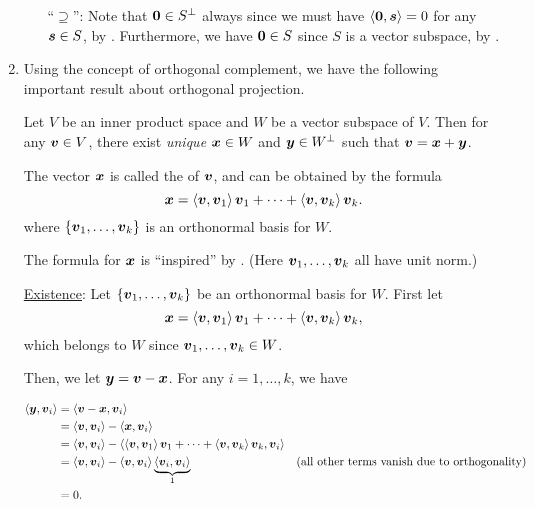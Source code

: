 \begin{enumerate}
\begin{pf}
\begin{enumerate}
``\(\supseteq\)'': Note that \(\vb*{0}\in S^{\perp}\) always since we must
have \(\left\langle \vb*{0},\vb*{s}\right\rangle=0\) for any \(\vb*{s}\in S\), by
. Furthermore, we have \(\vb*{0}\in S\) since \(S\) is
a vector subspace, by .
\end{enumerate}
\end{pf}
\item Using the concept of orthogonal complement, we have the following
important result about orthogonal projection.
\begin{theorem}
\label{thm:orthog-decomp}
Let \(V\) be an inner product space and \(W\) be a vector subspace of \(V\).
Then for any \(\vb*{v}\in V\), there exist \emph{unique} \(\vb*{x}\in W\) and
\(\vb*{y}\in W^{\perp}\) such that \(\vb*{v}=\vb*{x}+\vb*{y}\).

The vector \(\vb*{x}\) is called the  of
\(\vb*{v}\), and can be obtained by the formula
\[
\vb*{x}=\left\langle \vb*{v},\vb*{v}_1\right\rangle\vb*{v}_1+\dotsb+\left\langle \vb*{v},\vb*{v}_k\right\rangle\vb*{v}_k.
\]
where \(\{\vb*{v}_1,\dotsc,\vb*{v}_k\}\) is an orthonormal basis for \(W\).
\end{theorem}
\begin{note}
The formula for \(\vb*{x}\) is ``inspired'' by .
(Here \(\vb*{v}_1,\dotsc,\vb*{v}_k\) all have unit norm.)
\end{note}

\begin{pf}
\underline{Existence}: Let \(\{\vb*{v}_1,\dotsc,\vb*{v}_k\}\) be an
orthonormal basis for \(W\). First let
\[
\vb*{x}=\left\langle \vb*{v},\vb*{v}_1\right\rangle\vb*{v}_1+\dotsb+\left\langle \vb*{v},\vb*{v}_k\right\rangle\vb*{v}_k,
\]
which belongs to \(W\) since \(\vb*{v}_1,\dotsc,\vb*{v}_k\in W\).

Then, we let \(\vb*{y}=\vb*{v}-\vb*{x}\). For any \(i=1,\dotsc,k\), we have
\end{pf}
\begin{align*}
\left\langle \vb*{y},\vb*{v}_i\right\rangle&=\left\langle \vb*{v}-\vb*{x},\vb*{v}_i\right\rangle \\
&=\left\langle \vb*{v},\vb*{v}_i\right\rangle-\left\langle \vb*{x},\vb*{v}_i\right\rangle \\
&=\left\langle \vb*{v},\vb*{v}_i\right\rangle-\left\langle \left\langle \vb*{v},\vb*{v}_1\right\rangle\vb*{v}_1+\dotsb+\left\langle \vb*{v},\vb*{v}_k\right\rangle\vb*{v}_k,\vb*{v}_i\right\rangle \\
&=\left\langle \vb*{v},\vb*{v}_i\right\rangle-\left\langle \vb*{v},\vb*{v}_i\right\rangle\underbrace{\left\langle \vb*{v}_i,\vb*{v}_i\right\rangle}_{1} &\text{(all other terms vanish due to orthogonality)}\\
&=0.
\end{align*}


\end{enumerate}
